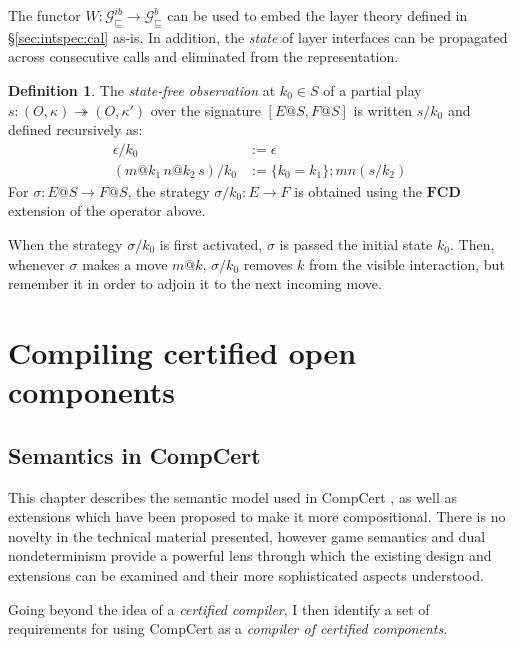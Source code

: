 \documentclass[11pt,oneside,draft]{book}
\theoremstyle{definition}
\newtheorem{definition}[theorem]{Definition}
\newcommand{\gcat}{\mathcal{G}_{\sqsubseteq}}
\begin{document}
The functor
$W : \gcat^{ib} \rightarrow \gcat^b$
can be used to embed the layer theory
defined in \S\ref{sec:intspec:cal} as-is.
In addition, the \emph{state} of layer interfaces
can be propagated across consecutive calls and
eliminated from the representation.

\begin{definition}
The \emph{state-free observation} at $k_0 \in S$
of a partial play
$s : (O, \kappa) \twoheadrightarrow (O, \kappa')$
over the signature $[E@S, F@S]$
is written $s/k_0$ and defined recursively as:
\begin{align*}
    \epsilon / k_0 &:= \epsilon \\
    (m@k_1 \, n@k_2 \, s) / k_0 &:=
      \{ k_0 = k_1 \} ; m n (s / k_2)
\end{align*}
For $\sigma : E@S \rightarrow F@S$,
the strategy $\sigma / k_0 : E \rightarrow F$
is obtained using the $\mathbf{FCD}$ extension
of the operator above.
\end{definition}

When the strategy $\sigma / k_0$ is first activated,
$\sigma$ is passed the initial state $k_0$.
Then, whenever $\sigma$ makes a move $m@k$,
$\sigma / k_0$ removes $k$ from the visible interaction,
but remember it in order to adjoin it to the next incoming move.



\part{Compiling certified open components} \label{part:compcerto}

\chapter{Semantics in CompCert} \label{sec:compcert-sem} %

This chapter describes the semantic model
used in CompCert \citep{compcert},
as well as extensions which have been proposed
to make it more compositional.
There is no novelty in the technical material presented,
however
game semantics and dual nondeterminism
provide a powerful lens
through which the existing design and extensions
can be examined
and their more sophisticated aspects understood.

Going beyond the idea of a
\emph{certified compiler},
I then identify a set of requirements
for using CompCert as a
\emph{compiler of certified components}.
\end{document}
